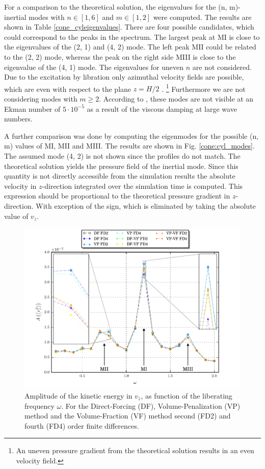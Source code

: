 For a comparison to the theoretical solution, the eigenvalues for the (n, m)-inertial modes with $n\in[1,6]$ and $m\in[1, 2]$ were computed.
The results are shown in Table \ref{cone_cyleigenvalues}.
There are four possible candidates,  which could correspond to the peaks in the spectrum.
The largest peak at M\RN{1} is close to the eigenvalues of the (2, 1) and (4, 2) mode.
The left peak  M\RN{2} could be related to the (2, 2) mode,  whereas the peak on the right side M\RN{3} is close to the eigenvalue of the (4, 1) mode.
The eigenvalues for uneven $n$ are not considered. Due to the excitation by libration only azimuthal velocity fields are possible, which are even
with respect to the plane $z=H/2$ \citep{Sauret2012}.
\footnote{An uneven pressure gradient from the theoretical solution results in an even velocity field.}
Furthermore we are not considering modes with $m\geq2$.
According to \citep{Sauret2012}, these modes are not visible at an Ekman number of $5\cdot10^{-5}$ as a
result of the viscous damping at large wave numbers.

A further comparison was done by computing the eigenmodes for the possible (n, m) values of M\RN{1}, M\RN{2} and M\RN{3}.
The results are shown in Fig. \ref{cone:cyl_modes}.
The assumed mode (4, 2) is not shown since the profiles do not match.
The theoretical solution yields the pressure field of the inertial mode.
Since this quantity is not directly accessible from the simulation results
the absolute velocity in $z$-direction integrated over the simulation time is computed.
This expression should be proportional to the theoretical pressure gradient in $z$-direction.
With exception of the sign, which is eliminated by taking the absolute value of $v_z$.
\clearpage
\begin{figure}[!t]
  \centering
  \includegraphics{gfx/cone/cylinder/cylinder.pdf}  \caption{\label{fig:cone:cyl}
    Amplitude of the kinetic energy in $v_z$, as function of the liberating frequency $\omega$.
   For the Direct-Forcing (DF), Volume-Penalization (VP) method and the Volume-Fraction (VF) method
      second (FD2)  and fourth (FD4) order finite differences.}
\end{figure}

